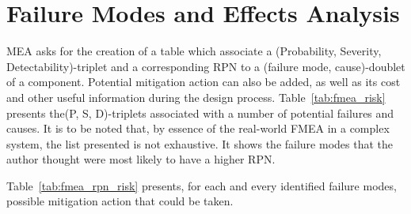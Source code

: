 %
%

\chapter{Failure Modes and Effects Analysis}
\label{app:app02}

MEA asks for the creation of a table which associate a (Probability, Severity, Detectability)-triplet and a corresponding RPN to a (failure mode, cause)-doublet of a component. Potential mitigation action can also be added, as well as its cost and other useful information during the design process. Table~\ref{tab:fmea_risk} presents the(P, S, D)-triplets associated with a number of potential failures and causes. It is to be noted that, by essence of the real-world FMEA in a complex system, the list presented is not exhaustive. It shows the failure modes that the author thought were most likely to have a higher RPN.

Table~\ref{tab:fmea_rpn_risk} presents, for each and every identified failure modes, possible mitigation action that could be taken.

